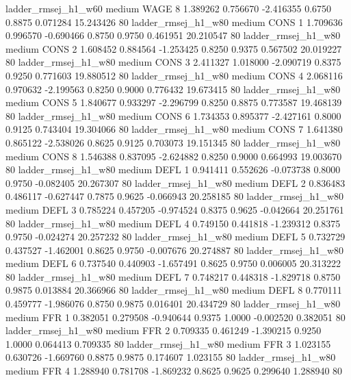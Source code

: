    ladder_rmsej_h1_w60     medium     WAGE                 8  1.389262 0.756670 -2.416355 0.6750 0.8875  0.071284   15.243426 80
   ladder_rmsej_h1_w80     medium     CONS                 1  1.709636 0.996570 -0.690466 0.8750 0.9750  0.461951   20.210547 80
   ladder_rmsej_h1_w80     medium     CONS                 2  1.608452 0.884564 -1.253425 0.8250 0.9375  0.567502   20.019227 80
   ladder_rmsej_h1_w80     medium     CONS                 3  2.411327 1.018000 -2.090719 0.8375 0.9250  0.771603   19.880512 80
   ladder_rmsej_h1_w80     medium     CONS                 4  2.068116 0.970632 -2.199563 0.8250 0.9000  0.776432   19.673415 80
   ladder_rmsej_h1_w80     medium     CONS                 5  1.840677 0.933297 -2.296799 0.8250 0.8875  0.773587   19.468139 80
   ladder_rmsej_h1_w80     medium     CONS                 6  1.734353 0.895377 -2.427161 0.8000 0.9125  0.743404   19.304066 80
   ladder_rmsej_h1_w80     medium     CONS                 7  1.641380 0.865122 -2.538026 0.8625 0.9125  0.703073   19.151345 80
   ladder_rmsej_h1_w80     medium     CONS                 8  1.546388 0.837095 -2.624882 0.8250 0.9000  0.664993   19.003670 80
   ladder_rmsej_h1_w80     medium     DEFL                 1  0.941411 0.552626 -0.073738 0.8000 0.9750 -0.082405   20.267307 80
   ladder_rmsej_h1_w80     medium     DEFL                 2  0.836483 0.486117 -0.627447 0.7875 0.9625 -0.066943   20.258185 80
   ladder_rmsej_h1_w80     medium     DEFL                 3  0.785224 0.457205 -0.974524 0.8375 0.9625 -0.042664   20.251761 80
   ladder_rmsej_h1_w80     medium     DEFL                 4  0.749150 0.441818 -1.239312 0.8375 0.9750 -0.024274   20.257232 80
   ladder_rmsej_h1_w80     medium     DEFL                 5  0.732729 0.437527 -1.462001 0.8625 0.9750 -0.007676   20.274887 80
   ladder_rmsej_h1_w80     medium     DEFL                 6  0.737540 0.440903 -1.657491 0.8625 0.9750  0.006005   20.313222 80
   ladder_rmsej_h1_w80     medium     DEFL                 7  0.748217 0.448318 -1.829718 0.8750 0.9875  0.013884   20.366966 80
   ladder_rmsej_h1_w80     medium     DEFL                 8  0.770111 0.459777 -1.986076 0.8750 0.9875  0.016401   20.434729 80
   ladder_rmsej_h1_w80     medium      FFR                 1  0.382051 0.279508 -0.940644 0.9375 1.0000 -0.002520    0.382051 80
   ladder_rmsej_h1_w80     medium      FFR                 2  0.709335 0.461249 -1.390215 0.9250 1.0000  0.064413    0.709335 80
   ladder_rmsej_h1_w80     medium      FFR                 3  1.023155 0.630726 -1.669760 0.8875 0.9875  0.174607    1.023155 80
   ladder_rmsej_h1_w80     medium      FFR                 4  1.288940 0.781708 -1.869232 0.8625 0.9625  0.299640    1.288940 80
